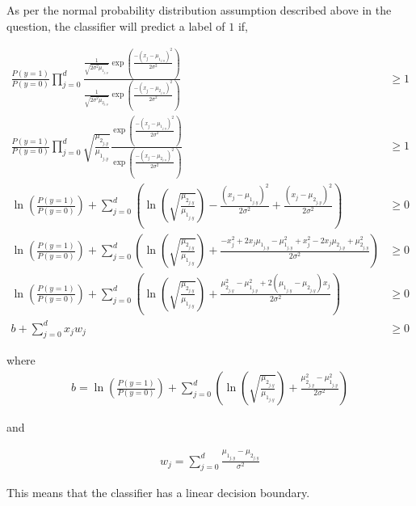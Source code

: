 As per the normal probability distribution assumption described above in the question, the classifier will predict a label of $1$ if,

\begin{equation*}
\begin{aligned}
\frac{P(y=1)}{P(y=0)} \displaystyle \prod_{j=0}^{d}  \frac{ \frac{1}{\sqrt{2 \sigma^2 \mu_{1_{j,y}}}} \exp\left(\frac{-\left(x_j - \mu_{1_{j,y}}\right)^2}{2\sigma^2}\right)}{   \frac{1}{\sqrt{2 \sigma^2 \mu_{2_{j,y}}}} \exp\left(\frac{-\left(x_j - \mu_{2_{j,y}}\right)^2}{2\sigma^2}\right)} &\geq 1\\
\frac{P(y=1)}{P(y=0)} \displaystyle \prod_{j=0}^{d} \sqrt{\frac{\mu_{2_{j,y}}}{\mu_{1_{j,y}}}} \frac{\exp\left(\frac{-\left(x_j - \mu_{1_{j,y}}\right)^2}{2\sigma^2}\right)}{\exp\left(\frac{-\left(x_j - \mu_{2_{j,y}}\right)^2}{2\sigma^2}\right)} &\geq 1\\
\ln \left( \frac{P(y=1)}{P(y=0)}\right) + \displaystyle \sum_{j=0}^{d} \left( \ln \left( \sqrt{\frac{\mu_{2_{j,y}}}{\mu_{1_{j,y}}}}  \right) - \frac{\left( x_j - \mu_{1_{j,y}} \right)^2}{2\sigma^2} + \frac{\left( x_j - \mu_{2_{j,y}} \right)^2}{2\sigma^2} \right) &\geq 0\\
\ln \left( \frac{P(y=1)}{P(y=0)}\right) + \displaystyle \sum_{j=0}^{d} \left( \ln \left( \sqrt{\frac{\mu_{2_{j,y}}}{\mu_{1_{j,y}}}}  \right) + \frac{-x_j^2 + 2x_j\mu_{1_{j,y}} - \mu_{1_{j,y}}^2 + x_j^2 - 2x_j\mu_{2_{j,y}} + \mu_{2_{j,y}}^2 }{2\sigma^2} \right) &\geq 0\\
\ln \left( \frac{P(y=1)}{P(y=0)}\right) + \displaystyle \sum_{j=0}^{d} \left( \ln \left( \sqrt{\frac{\mu_{2_{j,y}}}{\mu_{1_{j,y}}}}  \right) + \frac{\mu_{2_{j,y}}^2  - \mu_{1_{j,y}}^2 + 2(\mu_{1_{j,y}} - \mu_{2_{j,y}})x_j  }{2\sigma^2} \right) &\geq 0\\
b + \displaystyle \sum_{j=0}^{d} x_j w_j &\geq 0
\end{aligned}
\end{equation*}

where 
\begin{equation*}
\begin{aligned}
b=\ln \left( \frac{P(y=1)}{P(y=0)}\right) + \displaystyle \sum_{j=0}^{d} \left( \ln \left( \sqrt{\frac{\mu_{2_{j,y}}}{\mu_{1_{j,y}}}}  \right) + \frac{\mu_{2_{j,y}}^2  - \mu_{1_{j,y}}^2 }{2\sigma^2} \right) 
\end{aligned}
\end{equation*}

and

\begin{equation*}
\begin{aligned}
w_j = \displaystyle \sum_{j=0}^{d} \frac{\mu_{1_{j,y}} - \mu_{2_{j,y}}}{\sigma^2}
\end{aligned}
\end{equation*}

This means that the classifier has a linear decision boundary.
